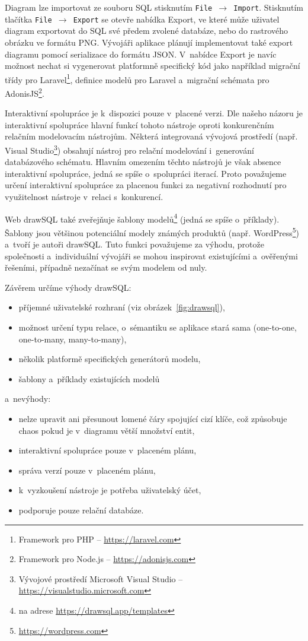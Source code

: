 Diagram lze importovat ze souboru SQL stisknutím \texttt{File $\rightarrow$
Import}. Stisknutím tlačítka \texttt{File $\rightarrow$ Export} se otevře
nabídka Export, ve které může uživatel diagram exportovat do SQL své předem
zvolené databáze, nebo do rastrového obrázku ve formátu PNG. Vývojáři aplikace
plánují implementovat také export diagramu pomocí serializace do formátu JSON.
V~nabídce Export je navíc možnost nechat si vygenerovat platformně specifický
kód jako například migrační třídy pro Laravel\footnote{Framework pro PHP --
\url{https://laravel.com}}, definice modelů pro Laravel a~migrační schémata pro
AdonisJS\footnote{Framework pro Node.js -- \url{https://adonisjs.com}}.

Interaktivní spolupráce je k~dispozici pouze v~placené verzi. Dle našeho názoru
je interaktivní spolupráce hlavní funkcí tohoto nástroje oproti konkurenčním
relačním modelovacím nástrojům. Některá integrovaná vývojová prostředí (např.
Visual Studio\footnote{Vývojové prostředí Microsoft Visual Studio --
\url{https://visualstudio.microsoft.com}}) obsahují nástroj pro relační
modelování i~generování databázového schématu. Hlavním omezením těchto nástrojů
je však absence interaktivní spolupráce, jedná se spíše o~spolupráci iterací.
Proto považujeme určení interaktivní spolupráce za placenou funkci za negativní
rozhodnutí pro využitelnost nástroje v~relaci s~konkurencí.

Web drawSQL také zveřejňuje šablony modelů\footnote{na adrese
\url{https://drawsql.app/templates}} (jedná se spíše o~příklady). Šablony jsou
většinou potenciální modely známých produktů (např.
WordPress\footnote{\url{https://wordpress.com}}) a~tvoří je autoři drawSQL.
Tuto funkci považujeme za výhodu, protože společnosti a~individuální vývojáři se
mohou inspirovat existujícími a~ověřenými řešeními, případně nezačínat se svým
modelem od nuly.

Závěrem určíme výhody drawSQL:
\begin{itemize}
  \item příjemné uživatelské rozhraní (viz obrázek~\ref{fig:drawsql}),
  \item možnost určení typu relace, o~sémantiku se aplikace stará sama
  (one-to-one, one-to-many, many-to-many),
  \item několik platformě specifických generátorů modelu,
  \item šablony a~příklady existujících modelů
\end{itemize}
a~nevýhody:
\begin{itemize}
  \item nelze upravit ani přesunout lomené čáry spojující cizí klíče, což
  způsobuje chaos pokud je v~diagramu větší množství entit,
  \item interaktivní spolupráce pouze v~placeném plánu,
  \item správa verzí pouze v~placeném plánu,
  \item k~vyzkoušení nástroje je potřeba uživatelský účet,
  \item podporuje pouze relační databáze.
\end{itemize}

